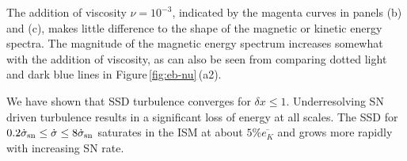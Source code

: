 \documentclass[preprint2]{aastex63}
\newcommand\SNr{\dot\sigma_{\rm sn}}
\newcommand\dx{ {\delta x}}
\newcommand{\fg}[1]{\textcolor{midgreen}{#1}}
\newcommand{\mm}[1]{\textcolor{mypurple}{#1}}
\begin{document}
 \fg{The addition of viscosity $\nu=10^{-3}$, indicated by the magenta curves in
 panels (b) and (c), \mm{makes little difference to the shape of the
   magnetic or kinetic energy spectra.  The magnitude of the magnetic
   energy spectrum increases somewhat with the addition of viscosity,
   as can also be seen from comparing dotted light and dark blue
   lines in Figure\,\ref{fig:eb-nu}\,(a2).}
}

 \fg{We have shown that SSD turbulence \mm{converges} for $\dx\leq1$.
 Underresolving SN driven turbulence results in a significant loss of energy
 at all scales. \mm{The}
 SSD for $0.2\SNr\leq \dot\sigma \leq 8\SNr$ saturates in the ISM at about
 $5\%\overline{e_K}$ and grows more rapidly with increasing SN rate.
 } 
\end{document}
